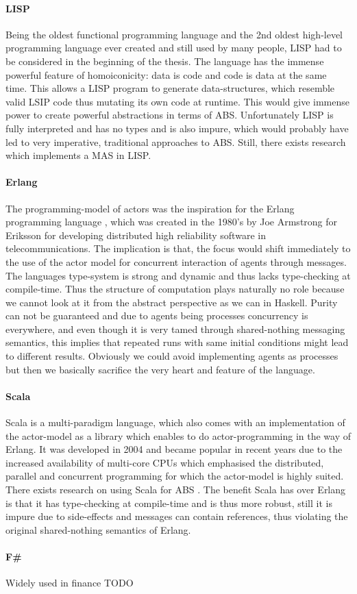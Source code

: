 \paragraph{LISP} Being the oldest functional programming language and the 2nd oldest high-level programming language ever created and still used by many people, LISP had to be considered in the beginning of the thesis. The language has the immense powerful feature of homoiconicity: data is code and code is data at the same time. This allows a LISP program to generate data-structures, which resemble valid LSIP code thus mutating its own code at runtime. This would give immense power to create powerful abstractions in terms of ABS. Unfortunately LISP is fully interpreted and has no types and is also impure, which would probably have led to very imperative, traditional approaches to ABS. Still, there exists research \cite{kawabe_nepi2programming_2000} which implements a MAS in LISP.
	
\paragraph{Erlang} The programming-model of actors \cite{agha_actors:_1986} was the inspiration for the Erlang programming language \cite{armstrong_erlang_2010}, which was created in the 1980's by Joe Armstrong for Eriksson for developing distributed high reliability software in telecommunications. The implication is that, the focus would shift immediately to the use of the actor model for concurrent interaction of agents through messages. The languages type-system is strong and dynamic and thus lacks type-checking at compile-time. Thus the structure of computation plays naturally no role because we cannot look at it from the abstract perspective as we can in Haskell. Purity can not be guaranteed and due to agents being processes concurrency is everywhere, and even though it is very tamed through shared-nothing messaging semantics, this implies that repeated runs with same initial conditions might lead to different results. Obviously we could avoid implementing agents as processes but then we basically sacrifice the very heart and feature of the language.
	
\paragraph{Scala} Scala is a multi-paradigm language, which also comes with an implementation of the actor-model as a library which enables to do actor-programming in the way of Erlang. It was developed in 2004 and became popular in recent years due to the increased availability of multi-core CPUs which emphasised the distributed, parallel and concurrent programming for which the actor-model is highly suited. There exists research on using Scala for ABS \cite{krzywicki_massively_2015, todd_multi-agent_nodate}. The benefit Scala has over Erlang is that it has type-checking at compile-time and is thus more robust, still it is impure due to side-effects and messages can contain references, thus violating the original shared-nothing semantics of Erlang.

\paragraph{F\#} Widely used in finance TODO 